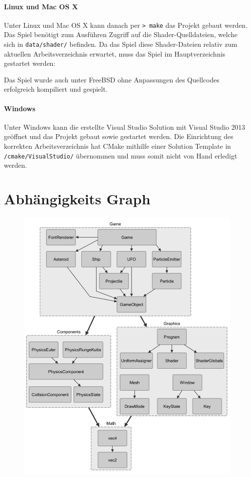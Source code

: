 \documentclass[12pt, a4paper, titlepage, hidelinks]{scrreprt}
\begin{document}
\paragraph{Linux und Mac OS X}
Unter Linux und Mac OS X kann danach per \texttt{>~make} das Projekt gebaut werden. Das Spiel benötigt zum Ausführen Zugriff auf die Shader-Quelldateien, welche sich in \texttt{data/shader/} befinden. Da das Spiel diese Shader-Dateien relativ zum aktuellen Arbeitsverzeichnis erwartet, muss das Spiel im Hauptverzeichnis gestartet werden:

Das Spiel wurde auch unter FreeBSD ohne Anpassungen des Quellcodes erfolgreich kompiliert und gespielt.

\paragraph{Windows}
Unter Windows kann die erstellte Visual Studio Solution mit Visual Studio 2013 geöffnet und das Projekt gebaut sowie gestartet werden. Die Einrichtung des korrekten Arbeitsverzeichnis hat CMake mithilfe einer Solution Template in \texttt{/cmake/VisualStudio/} übernommen und muss somit nicht von Hand erledigt werden.

\section{Abhängigkeits Graph}
\begin{figure}[h!]
  \centering
  \includegraphics[width=\textwidth]{../graphs/dependency1.png}
\end{figure}
\end{document}
